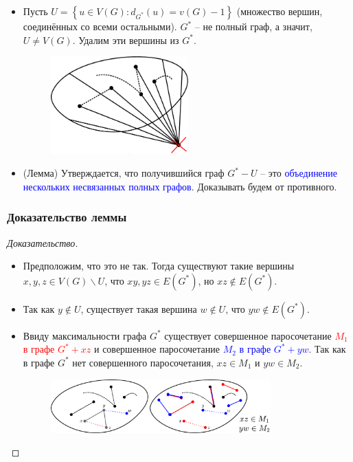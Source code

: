 \begin{frame}[t]
    \begin{itemize}
        \item Пусть $U = \left\{ u \in V(G): d_{G^{*}}(u) = v(G) - 1  \right \}$ (множество вершин, соединённых со всеми остальными). $G^{*}$ -- не полный граф, а значит, $U \neq V(G)$. Удалим эти вершины из $G^*$.

             \begin{figure}[h]
                \centering
                \includegraphics[width=0.5\textwidth]{images/gstar1}
                \label{fig:gstar}
            \end{figure}
        \item (Лемма) Утверждается, что получившийся граф $G^* - U$ -- это \textcolor{blue}{объединение нескольких несвязанных полных графов}. Доказывать будем от противного. 
    \end{itemize}
    
\end{frame}


\begin{frame}[t]
    \frametitle{Доказательство леммы}
    \begin{proof}[Доказательство]
        \renewcommand{\qedsymbol}{}
        \begin{itemize}
            \item Предположим, что это не так. Тогда существуют такие вершины $x, y , z \in  V (G ) \backslash U$, что $xy , yz \in  E (G ^* )$, но $xz \notin  E (G^* )$.
                
            \item Так как $y \notin U$, существует такая вершина $w \notin U$, что $yw \notin E (G^*)$.
            \item Ввиду максимальности графа $G^*$ существует совершенное паросочетание \textcolor{red}{$M_1$ в графе $G^* + xz$} и совершенное паросочетание \textcolor{blue}{$M_2$ в графе $G^* + yw$}. Так как в графе $G^*$ нет совершенного паросочетания, $xz \in M_1$ и $yw \in  M_2$.
                \begin{figure}[h]
                    \centering
                    \includegraphics[width=0.8\textwidth]{images/fullgraph2}
                    \label{fig:fullgraph1}
                \end{figure}
        \end{itemize}
    \end{proof}
\end{frame}

